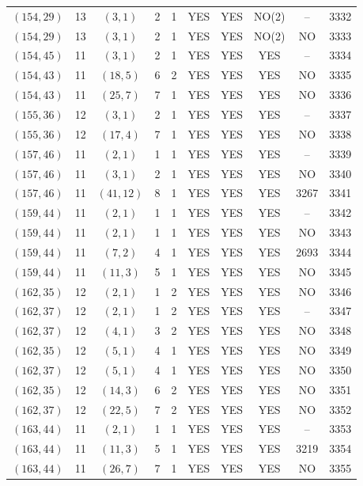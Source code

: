 \begin{longtable}{|c|c|c|c|c|c|c|c|c|c|}
$(154, 29)$ & 13 & $(3, 1)$ & 2 & 1 & YES & YES & NO(2) & -- & 3332\\
$(154, 29)$ & 13 & $(3, 1)$ & 2 & 1 & YES & YES & NO(2) & NO & 3333\\
$(154, 45)$ & 11 & $(3, 1)$ & 2 & 1 & YES & YES & YES & -- & 3334\\
$(154, 43)$ & 11 & $(18, 5)$ & 6 & 2 & YES & YES & YES & NO & 3335\\
$(154, 43)$ & 11 & $(25, 7)$ & 7 & 1 & YES & YES & YES & NO & 3336\\
$(155, 36)$ & 12 & $(3, 1)$ & 2 & 1 & YES & YES & YES & -- & 3337\\
$(155, 36)$ & 12 & $(17, 4)$ & 7 & 1 & YES & YES & YES & NO & 3338\\
$(157, 46)$ & 11 & $(2, 1)$ & 1 & 1 & YES & YES & YES & -- & 3339\\
$(157, 46)$ & 11 & $(3, 1)$ & 2 & 1 & YES & YES & YES & NO & 3340\\
$(157, 46)$ & 11 & $(41, 12)$ & 8 & 1 & YES & YES & YES & 3267 & 3341\\
$(159, 44)$ & 11 & $(2, 1)$ & 1 & 1 & YES & YES & YES & -- & 3342\\
$(159, 44)$ & 11 & $(2, 1)$ & 1 & 1 & YES & YES & YES & NO & 3343\\
$(159, 44)$ & 11 & $(7, 2)$ & 4 & 1 & YES & YES & YES & 2693 & 3344\\
$(159, 44)$ & 11 & $(11, 3)$ & 5 & 1 & YES & YES & YES & NO & 3345\\
$(162, 35)$ & 12 & $(2, 1)$ & 1 & 2 & YES & YES & YES & NO & 3346\\
$(162, 37)$ & 12 & $(2, 1)$ & 1 & 2 & YES & YES & YES & -- & 3347\\
$(162, 37)$ & 12 & $(4, 1)$ & 3 & 2 & YES & YES & YES & NO & 3348\\
$(162, 35)$ & 12 & $(5, 1)$ & 4 & 1 & YES & YES & YES & NO & 3349\\
$(162, 37)$ & 12 & $(5, 1)$ & 4 & 1 & YES & YES & YES & NO & 3350\\
$(162, 35)$ & 12 & $(14, 3)$ & 6 & 2 & YES & YES & YES & NO & 3351\\
$(162, 37)$ & 12 & $(22, 5)$ & 7 & 2 & YES & YES & YES & NO & 3352\\
$(163, 44)$ & 11 & $(2, 1)$ & 1 & 1 & YES & YES & YES & -- & 3353\\
$(163, 44)$ & 11 & $(11, 3)$ & 5 & 1 & YES & YES & YES & 3219 & 3354\\
$(163, 44)$ & 11 & $(26, 7)$ & 7 & 1 & YES & YES & YES & NO & 3355\\

\end{longtable}
